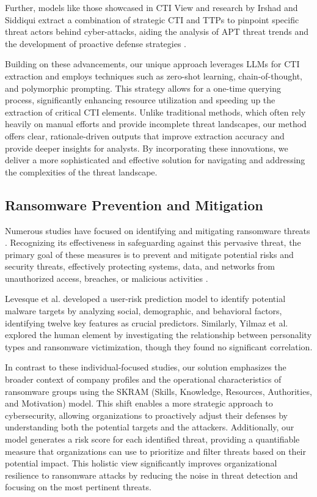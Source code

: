 \documentclass[running heads]{llncs}
\begin{document}
Further, models like those showcased in CTI View and research by Irshad and Siddiqui extract a combination of strategic CTI and TTPs to pinpoint specific threat actors behind cyber-attacks, aiding the analysis of APT threat trends and the development of proactive defense strategies \cite{CtiView, Irshad2023}.

Building on these advancements, our unique approach leverages LLMs for CTI extraction and employs techniques such as zero-shot learning, chain-of-thought, and polymorphic prompting. This strategy allows for a one-time querying process, significantly enhancing resource utilization and speeding up the extraction of critical CTI elements. Unlike traditional methods, which often rely heavily on manual efforts and provide incomplete threat landscapes, our method offers clear, rationale-driven outputs that improve extraction accuracy and provide deeper insights for analysts. By incorporating these innovations, we deliver a more sophisticated and effective solution for navigating and addressing the complexities of the threat landscape.

\subsection{Ransomware Prevention and Mitigation}
Numerous studies have focused on identifying and mitigating ransomware threats \cite{McIntosh:2023,Oujezsky:2023,Thomas:2018,Chayal:2022, Kim2022}. Recognizing its effectiveness in safeguarding against this pervasive threat, the primary goal of these measures is to prevent and mitigate potential risks and security threats, effectively protecting systems, data, and networks from unauthorized access, breaches, or malicious activities \cite{Aldaraani:2018}.

Levesque et al. \cite{Levesque2014} developed a user-risk prediction model to identify potential malware targets by analyzing social, demographic, and behavioral factors, identifying twelve key features as crucial predictors. Similarly, Yilmaz et al. \cite{Yilmaz2023} explored the human element by investigating the relationship between personality types and ransomware victimization, though they found no significant correlation.

In contrast to these individual-focused studies, our solution emphasizes the broader context of company profiles and the operational characteristics of ransomware groups using the SKRAM (Skills, Knowledge, Resources, Authorities, and Motivation) model. This shift enables a more strategic approach to cybersecurity, allowing organizations to proactively adjust their defenses by understanding both the potential targets and the attackers. Additionally, our model generates a risk score for each identified threat, providing a quantifiable measure that organizations can use to prioritize and filter threats based on their potential impact. This holistic view significantly improves organizational resilience to ransomware attacks by reducing the noise in threat detection and focusing on the most pertinent threats.
\end{document}
